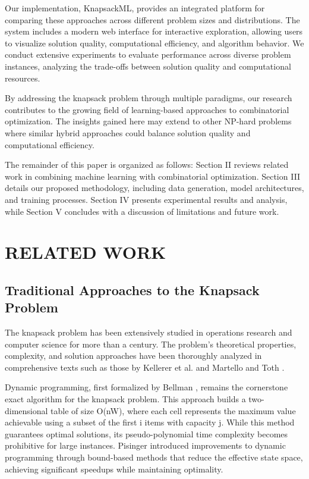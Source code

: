 \documentclass[conference, a4paper]{IEEEtran}
\begin{document}
Our implementation, KnapsackML, provides an integrated platform for comparing these approaches across different problem sizes and distributions. The system includes a modern web interface for interactive exploration, allowing users to visualize solution quality, computational efficiency, and algorithm behavior. We conduct extensive experiments to evaluate performance across diverse problem instances, analyzing the trade-offs between solution quality and computational resources.

By addressing the knapsack problem through multiple paradigms, our research contributes to the growing field of learning-based approaches to combinatorial optimization. The insights gained here may extend to other NP-hard problems where similar hybrid approaches could balance solution quality and computational efficiency.

The remainder of this paper is organized as follows: Section II reviews related work in combining machine learning with combinatorial optimization. Section III details our proposed methodology, including data generation, model architectures, and training processes. Section IV presents experimental results and analysis, while Section V concludes with a discussion of limitations and future work.

\section{RELATED WORK}
\subsection{Traditional Approaches to the Knapsack Problem}
The knapsack problem has been extensively studied in operations research and computer science for more than a century. The problem's theoretical properties, complexity, and solution approaches have been thoroughly analyzed in comprehensive texts such as those by Kellerer et al. \cite{kellerer2004knapsack} and Martello and Toth \cite{martello1990knapsack}. 

Dynamic programming, first formalized by Bellman \cite{bellman1957dynamic}, remains the cornerstone exact algorithm for the knapsack problem. This approach builds a two-dimensional table of size O(nW), where each cell represents the maximum value achievable using a subset of the first i items with capacity j. While this method guarantees optimal solutions, its pseudo-polynomial time complexity becomes prohibitive for large instances. Pisinger \cite{pisinger1999linear} introduced improvements to dynamic programming through bound-based methods that reduce the effective state space, achieving significant speedups while maintaining optimality.
\end{document}
